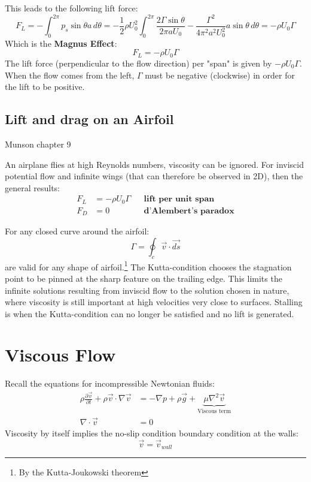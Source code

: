 This leads to the following lift force:
\begin{equation*}
	F_L = -\int_0^{2\pi} p_s \sin\theta a\,d\theta= -\frac{1}{2}\rho U_0^2\int_0^{2\pi} \frac{2\Gamma \sin\theta}{2\pi a U_0} - \frac{\Gamma^2}{4\pi^2 a^2 U_0^2}a\sin\theta \,d\theta = -\rho U_0 \Gamma
\end{equation*}
Which is the \textbf{Magnus Effect}:
\begin{equation*}
	\boxed{F_L = -\rho U_0 \Gamma}
\end{equation*}
The lift force (perpendicular to the flow direction) per "span" is given by $-\rho U_0 \Gamma$.
When the flow comes from the left, $\Gamma$ must be negative (clockwise) in order for the lift to be positive.
\subsection{Lift and drag on an Airfoil}
\footnotesize{Munson chapter 9}

An airplane flies at high Reynolds numbers, viscosity can be ignored. For inviscid potential flow and infinite wings (that can therefore be observed in 2D), then the general results:
\begin{equation*}
	\begin{aligned}
		F_L &= -\rho U_0 \Gamma &&\textbf{lift per unit span}\\
		F_D &= 0 && \textbf{d'Alembert's paradox}
	\end{aligned}
\end{equation*}

For any closed curve around the airfoil:
\begin{equation*}
	\Gamma = \oint_c \vec v \cdot \vec{ds}
\end{equation*}
are valid for any shape of airfoil.\footnote{By the Kutta-Joukowski theorem} The Kutta-condition chooses the stagnation point to be pinned at the sharp feature on the trailing edge. This limits the infinite solutions resulting from inviscid flow to the solution chosen in nature, where viscosity is still important at high velocities very close to surfaces. Stalling is when the Kutta-condition can no longer be satisfied and no lift is generated.

\section{Viscous Flow}
Recall the equations for incompressible Newtonian fluids:
\begin{equation*}
\begin{split}
		\rho \frac{\partial \vec v}{\partial t}+ \rho \vec v \cdot \nabla \vec v &= -\nabla p + \rho \vec g + \underbrace{\mu \nabla^2 \vec v }_{\text{Viscous term}}\\
		\nabla \cdot \vec v &= 0
\end{split}
\end{equation*}
Viscosity by itself implies the no-slip condition boundary condition at the walls: 
\begin{equation*}
	\vec v = \vec v_{wall}
\end{equation*}

